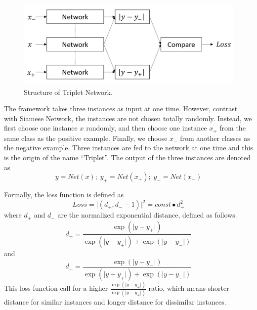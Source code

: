 \documentclass[10pt,twocolumn,letterpaper]{article}
\begin{document}
			\begin{figure}[htbp]
				\begin{center}
					\includegraphics[width=0.9\linewidth]{triplet_struct}
				\end{center}
				\caption{Structure of Triplet Network.\label{fig:triplet_struct}}
			\end{figure}
			
			The framework takes three instances as input at one time. However, contrast with Siamese Network, the instances are not chosen totally randomly. Instead, we first choose one instance $x$ randomly, and then choose one instance $x_+$ from the same class as the positive example. Finally, we choose $x_-$ from another classes as the negative example. Three instances are fed to the network at one time and this is the origin of the name ``Triplet''. The output of the three instances are denoted as
			\begin{equation}
				y = Net(x);\; y_+ = Net(x_+);\; y_-=Net(x_-)
			\end{equation}
			
			Formally, the loss function is defined as
			\begin{equation}
				Loss = \lvert(d_+, d_--1)\rvert^2 = const\bullet d_+^2
			\end{equation}
			where $d_+$ and $d_-$ are the normalized exponential distance, defined as follows.
			\begin{equation}
				d_+ = \frac{\exp{(\lvert y-y_+ \rvert)}}{\exp{(\lvert y-y_+ \rvert)} + \exp{(\lvert y-y_- \rvert)}}
			\end{equation}
			and
			\begin{equation}
				d_- = \frac{\exp{(\lvert y-y_- \rvert)}}{\exp{(\lvert y-y_+ \rvert)} + \exp{(\lvert y-y_- \rvert)}}
			\end{equation}
			This loss function call for a higher $\frac{\exp{(\lvert y-y_+ \rvert)}}{\exp{(\lvert y-y_+ \rvert)}}$ ratio, which means shorter distance for similar instances and longer distance for dissimilar instances.
			
\end{document}
